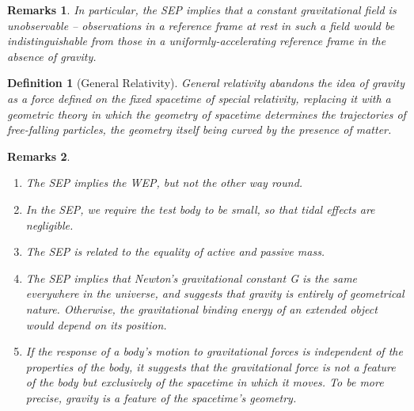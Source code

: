 \documentclass[a4paper]{article}
\newtheorem{remarks}{Remarks}[section]
\theoremstyle{new}
\newtheorem{defi}{Definition}[section]
\begin{document}
\begin{remarks}
In particular, the SEP implies that a constant gravitational field is unobservable – observations in a reference frame at rest in such a field would be indistinguishable from those in a uniformly-accelerating reference frame in the absence of gravity.
\end{remarks}
\begin{defi}[General Relativity]
General relativity abandons the idea of gravity as a force defined on the fixed spacetime of special relativity, replacing it with a geometric theory in which the geometry of spacetime determines the trajectories of free-falling particles, the geometry itself being curved by the presence of matter.
\end{defi}
\begin{remarks}\leavevmode
\begin{enumerate}
\item The SEP implies the WEP, but not the other way round.
\item In the SEP, we require the test body to be small, so that tidal effects are negligible. 
\item The SEP is related to the equality of active and passive mass. 
\item The SEP implies that Newton’s gravitational constant G is the same everywhere in the universe, and suggests that gravity is entirely of geometrical nature. Otherwise, the gravitational binding energy of an extended object would depend on its position.
\item If the response of a body’s motion to gravitational forces is independent of the properties of the body, it suggests that the gravitational force is not a feature of the body but exclusively of the spacetime in which it moves. To be more precise, gravity is a feature of the spacetime’s geometry.
\end{enumerate}
\end{remarks}
\end{document}
